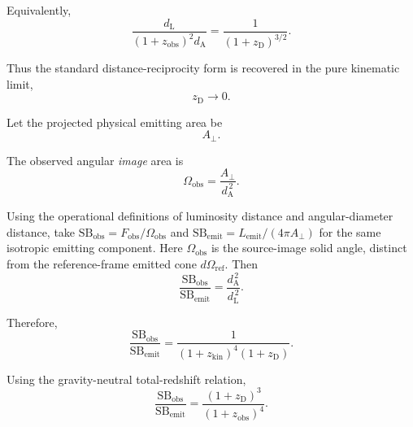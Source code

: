 Equivalently,
\begin{equation}
    \boxed{
    \frac{
        d_{\mathrm L}
    }{
        (1+z_{\mathrm{obs}})^2
        d_{\mathrm A}
    }
    =
    \frac{1}{
        (1+z_{\mathrm D})^{3/2}
    }.
    }
\end{equation}

Thus the standard distance-reciprocity form is recovered in the pure
kinematic limit,
\begin{equation}
    z_{\mathrm D}
    \rightarrow
    0.
\end{equation}

Let the projected physical emitting area be
\begin{equation}
    A_\perp.
\end{equation}

The observed angular \emph{image} area is
\begin{equation}
    \Omega_{\mathrm{obs}}
    =
    \frac{
        A_\perp
    }{
        d_{\mathrm A}^{\,2}
    }.
\end{equation}

Using the operational definitions of luminosity distance and angular-diameter
distance, take \(\mathrm{SB}_{\mathrm{obs}}=F_{\mathrm{obs}}/\Omega_{\mathrm{obs}}\)
and \(\mathrm{SB}_{\mathrm{emit}}=L_{\mathrm{emit}}/(4\pi A_\perp)\) for
the same isotropic emitting component. Here \(\Omega_{\mathrm{obs}}\) is the
source-image solid angle, distinct from the reference-frame emitted cone
\(d\Omega_{\mathrm{ref}}\). Then
\begin{equation}
    \frac{
        \mathrm{SB}_{\mathrm{obs}}
    }{
        \mathrm{SB}_{\mathrm{emit}}
    }
    =
    \frac{
        d_{\mathrm A}^{\,2}
    }{
        d_{\mathrm L}^{\,2}
    }.
\end{equation}

Therefore,
\begin{equation}
    \boxed{
    \frac{
        \mathrm{SB}_{\mathrm{obs}}
    }{
        \mathrm{SB}_{\mathrm{emit}}
    }
    =
    \frac{1}{
        (1+z_{\mathrm{kin}})^4
        (1+z_{\mathrm D})
    }.
    }
\end{equation}

Using the gravity-neutral total-redshift relation,
\begin{equation}
    \boxed{
    \frac{
        \mathrm{SB}_{\mathrm{obs}}
    }{
        \mathrm{SB}_{\mathrm{emit}}
    }
    =
    \frac{
        (1+z_{\mathrm D})^3
    }{
        (1+z_{\mathrm{obs}})^4
    }.
    }
\end{equation}

